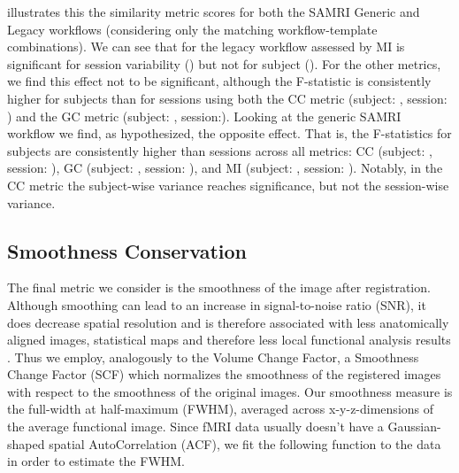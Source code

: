  illustrates this the similarity metric scores for both the SAMRI Generic and Legacy workflows (considering only the matching workflow-template combinations).
We can see that for the legacy workflow assessed by MI is significant for session variability () but not for subject ().
For the other metrics, we find this effect not to be significant, although the F-statistic is consistently higher for subjects than for sessions using both
the CC metric (subject: , session: )
and the GC metric (subject: , session:).
Looking at the generic SAMRI workflow we find, as hypothesized, the opposite effect.
That is, the F-statistics for subjects are consistently higher than sessions across all metrics:
CC (subject: , session: ),
GC (subject: , session: ),
and MI (subject: , session: ).
Notably, in the CC metric the subject-wise variance reaches significance, but not the session-wise variance.

\subsection{Smoothness Conservation}

The final metric we consider is the smoothness of the image after registration.
Although smoothing can lead to an increase in signal-to-noise ratio (SNR), it does decrease spatial resolution and is therefore associated with less anatomically aligned images, statistical maps and therefore less local functional analysis results \cite{fmriprep}.
Thus we employ, analogously to the Volume Change Factor, a Smoothness Change Factor (SCF) which normalizes the smoothness of the registered images with respect to the smoothness of the original images.
Our smoothness measure is the full-width at half-maximum (FWHM), averaged across x-y-z-dimensions of the average functional image.
Since fMRI data usually doesn't have a Gaussian-shaped spatial AutoCorrelation (ACF), we fit the following function to the data in order to estimate the FWHM.

